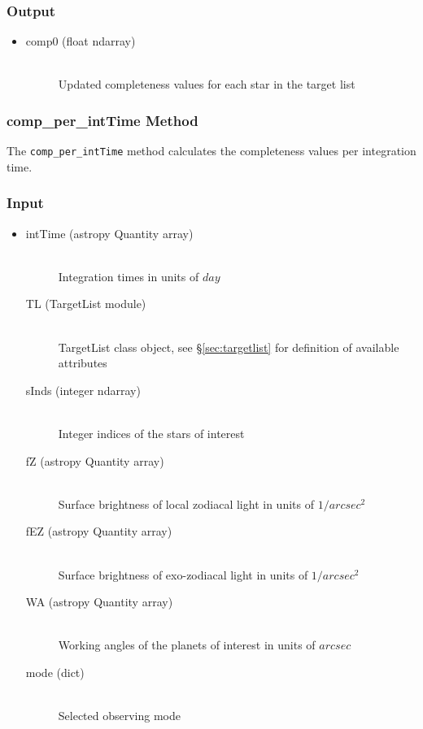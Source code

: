 \documentclass[cleanfoot]{asme2ej}
\begin{document}
\subsubsection*{Output}
\begin{itemize}
\item 
\begin{description}
    \item[comp0 (float ndarray)] \hfill \\
        Updated completeness values for each star in the target list
\end{description}
\end{itemize}

\subsubsection{comp\_per\_intTime Method}
\label{sec:compperintTime}
The \verb+comp_per_intTime+ method calculates the completeness values per integration time.

\subsubsection*{Input}
\begin{itemize}
\item 
\begin{description}
    \item[intTime (astropy Quantity array)] \hfill \\ Integration times in units of $ day $
    \item[TL (TargetList module)] \hfill \\ TargetList class object, see \S\ref{sec:targetlist} for definition of available attributes
    \item[sInds (integer ndarray)] \hfill \\ Integer indices of the stars of interest
    \item[fZ (astropy Quantity array)] \hfill \\ Surface brightness of local zodiacal light in units of $ 1/arcsec^2 $
    \item[fEZ (astropy Quantity array)] \hfill \\ Surface brightness of exo-zodiacal light in units of $ 1/arcsec^2 $
    \item[WA (astropy Quantity array)] \hfill \\ Working angles of the planets of interest in units of $ arcsec $
    \item[mode (dict)] \hfill \\ Selected observing mode
\end{description}
\end{itemize}
\end{document}

